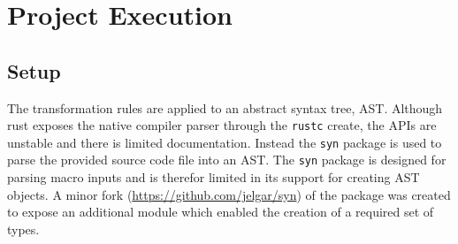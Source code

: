 \documentclass[ oneside,%
                    author={James Elgar},
                    degree={MEng},
                     title={Bidirectional transformer between functional and \\ object-oriented programming in Rust},
                  subtitle={}]{dissertation}
\begin{document}






\chapter{Project Execution}
\label{chap:execution}

\section{Setup}

The transformation rules are applied to an abstract syntax tree, AST. 
Although rust exposes the native compiler parser through the \verb|rustc| create, the APIs are unstable and there is limited documentation. Instead the \verb|syn| package is used to parse the provided source code file into an AST. 
The \verb|syn| package is designed for parsing macro inputs and is therefor limited in its support for creating AST objects. A minor fork (\url{https://github.com/jelgar/syn}) of the package was created to expose an additional module which enabled the creation of a required set of types.
\end{document}
